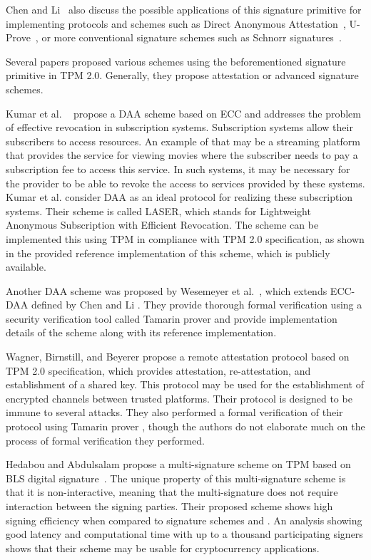 Chen and Li~\cite{chen2013flexible} also discuss the possible applications of this signature primitive for implementing protocols and schemes such as Direct Anonymous Attestation~\cite{daaSpec}, U-Prove~\cite{uproveSpec}, or more conventional signature schemes such as Schnorr signatures~\cite{schnorrSpec}. 

Several papers proposed various schemes using the beforementioned signature primitive in TPM 2.0. Generally, they propose attestation or advanced signature schemes.

Kumar et al. ~\cite{kumar2018direct} propose a DAA scheme based on ECC and addresses the problem of effective revocation in subscription systems. Subscription systems allow their subscribers to access resources. An example of that may be a streaming platform that provides the service for viewing movies where the subscriber needs to pay a subscription fee to access this service. In such systems, it may be necessary for the provider to be able to revoke the access to services provided by these systems. Kumar et al. consider DAA as an ideal protocol for realizing these subscription systems. Their scheme is called LASER, which stands for Lightweight Anonymous Subscription with Efficient Revocation. The scheme can be implemented this using TPM in compliance with TPM 2.0 specification, as shown in the provided reference implementation of this scheme, which is publicly available. 

Another DAA scheme was proposed by Wesemeyer et al.~\cite{wesemeyerDAA}, which extends ECC-DAA defined by Chen and Li \cite{chen2013flexible}. They provide thorough formal verification using a security verification tool called Tamarin prover \cite{meier2013tamarin} and provide implementation details of the scheme along with its reference implementation.

Wagner, Birnstill, and Beyerer \cite{wagnerRemoteAttProtocol} propose a remote attestation protocol based on TPM 2.0 specification, which provides attestation, re-attestation, and establishment of a shared key. This protocol may be used for the establishment of encrypted channels between trusted platforms. Their protocol is designed to be immune to several attacks. They also performed a formal verification of their protocol using Tamarin prover \cite{meier2013tamarin}, though the authors do not elaborate much on the process of formal verification they performed.

Hedabou and Abdulsalam \cite{hedabou2020efficient} propose a multi-signature scheme on TPM based on BLS digital signature~\cite{blsSignatures}. The unique property of this multi-signature scheme is that it is non-interactive, meaning that the multi-signature does not require interaction between the signing parties. Their proposed scheme shows high signing efficiency when compared to signature schemes \cite{chen2013flexible} and \cite{schnorrSpec}. An analysis showing good latency and computational time with up to a thousand participating signers shows that their scheme may be usable for cryptocurrency applications.

